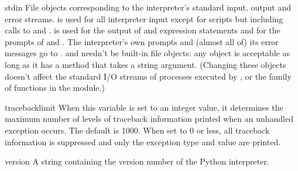 \begin{datadesc}{stdin}
  File objects corresponding to the interpreter's standard input,
  output and error streams.   is used for all
  interpreter input except for scripts but including calls to
   and .   is used
  for the output of  and expression statements and for the
  prompts of  and .  The interpreter's
  own prompts and (almost all of) its error messages go to
  .   and  needn't
  be built-in file objects: any object is acceptable as long as it has
  a  method that takes a string argument.  (Changing these
  objects doesn't affect the standard I/O streams of processes
  executed by ,  or the 
  family of functions in the  module.)
\end{datadesc}

\begin{datadesc}{tracebacklimit}
When this variable is set to an integer value, it determines the
maximum number of levels of traceback information printed when an
unhandled exception occurs.  The default is 1000.  When set to 0 or
less, all traceback information is suppressed and only the exception
type and value are printed.
\end{datadesc}

\begin{datadesc}{version}
A string containing the version number of the Python interpreter.  
\end{datadesc}
